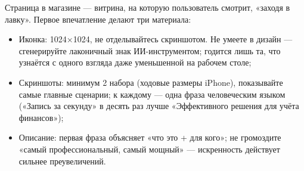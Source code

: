 
Страница в магазине — витрина, на которую пользователь смотрит, «заходя в лавку». Первое впечатление делают три материала:

\begin{itemize}
  \item Иконка: 1024×1024, не отделывайтесь скриншотом. Не умеете в дизайн — сгенерируйте лаконичный знак ИИ-инструментом; годится лишь та, что узнаётся с одного взгляда даже уменьшенной на рабочем столе;
  \item Скриншоты: минимум 2 набора (ходовые размеры iPhone), показывайте самые главные сценарии; к каждому — одна фраза человеческим языком («Запись за секунду» в десять раз лучше «Эффективного решения для учёта финансов»);
  \item Описание: первая фраза объясняет «что это + для кого»; не громоздите «самый профессиональный, самый мощный» — искренность действует сильнее преувеличений.
\end{itemize}

